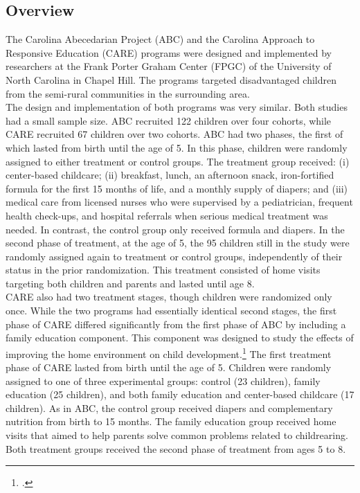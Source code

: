 \subsection{Overview}

\noindent The Carolina Abecedarian Project (ABC) and the Carolina Approach to Responsive Education (CARE) programs were designed and implemented by researchers at the Frank Porter Graham Center (FPGC) of the University of North Carolina in Chapel Hill. The programs targeted disadvantaged children from the semi-rural communities in the surrounding area.\\

\noindent The design and implementation of both programs was very similar. Both studies had a small sample size. ABC recruited 122 children over four cohorts, while CARE recruited 67 children over two cohorts. ABC had two phases, the first of which lasted from birth until the age of 5. In this phase, children were randomly assigned to either treatment or control groups. The treatment group received: (i) center-based childcare; (ii) breakfast, lunch, an afternoon snack, iron-fortified formula for the first 15 months of life, and a monthly supply of diapers; and (iii) medical care from licensed nurses who were supervised by a pediatrician, frequent health check-ups, and hospital referrals when serious medical treatment was needed. In contrast, the control group only received formula and diapers. In the second phase of treatment, at the age of 5, the 95 children still in the study were randomly assigned again to treatment or control groups, independently of their status in the prior randomization. This treatment consisted of home visits targeting both children and parents and lasted until age 8.\\ 

\noindent  CARE also had two treatment stages, though children were randomized only once. While the two programs had essentially identical second stages, the first phase of CARE differed significantly from the first phase of ABC by including a family education component. This component was designed to study the effects of improving the home environment on child development.\footnote{\citet{Wasik_Ramey_etal_1990_CD}.} The first treatment phase of CARE lasted from birth until the age of 5. Children were randomly assigned to one of three experimental groups: control (23 children), family education (25 children), and both family education and center-based childcare (17 children). As in ABC, the control group received diapers and complementary nutrition from birth to 15 months. The family education group received home visits that aimed to help parents solve common problems related to childrearing. Both treatment groups received the second phase of treatment from ages 5 to 8.\\

